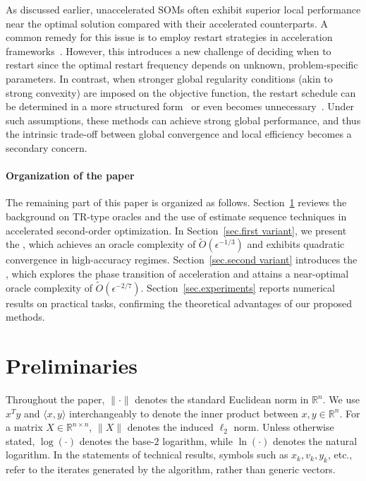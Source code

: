 \documentclass[moor,sglanonrev]{informs4}
\begin{document}
As discussed earlier, unaccelerated SOMs often exhibit superior local performance near the optimal solution compared with their accelerated counterparts. A common remedy for this issue is to employ restart strategies in acceleration frameworks~\cite{nesterov2018lectures}. However, this introduces a new challenge of deciding when to restart since the optimal restart frequency depends on unknown, problem-specific parameters. In contrast, when stronger global regularity conditions (akin to strong convexity) are imposed on the objective function, the restart schedule can be determined in a more structured form~\cite{ostroukhov2020tensor, lin2025perseus, huang2025approximation} or even becomes unnecessary~\cite{jiang2022generalized, marquesalves2022variants}. Under such assumptions, these methods can achieve strong global performance, and thus the intrinsic trade-off between global convergence and local efficiency becomes a secondary concern.

\paragraph{Organization of the paper}
The remaining part of this paper is organized as follows. Section~\ref{sec.priliminary} reviews the background on TR-type oracles and the use of estimate sequence techniques in accelerated second-order optimization. In Section~\ref{sec.first variant}, we present the , which achieves an oracle complexity of $\tilde O(\epsilon^{-1/3})$ and exhibits quadratic convergence in high-accuracy regimes. Section~\ref{sec.second variant} introduces the , which explores the phase transition of acceleration and attains a near-optimal oracle complexity of $\tilde O(\epsilon^{-2/7})$. Section~\ref{sec.experiments} reports numerical results on practical tasks, confirming the theoretical advantages of our proposed methods.


\section{Preliminaries}
\label{sec.priliminary}
Throughout the paper, $\|\cdot\|$ denotes the standard Euclidean norm in $\mathbb{R}^n$. We use $x^T y$ and $\langle x,y\rangle$ interchangeably to denote the inner product between $x,y\in\mathbb{R}^n$. For a matrix $X\in\mathbb{R}^{n\times n}$, $\|X\|$ denotes the induced $\ell_2$ norm. Unless otherwise stated, $\log(\cdot)$ denotes the base-$2$ logarithm, while $\ln(\cdot)$ denotes the natural logarithm. {\color{red} In the statements of technical results, symbols such as $x_k,v_k,y_k$, etc., refer to the iterates generated by the algorithm, rather than generic vectors.}
\end{document}
